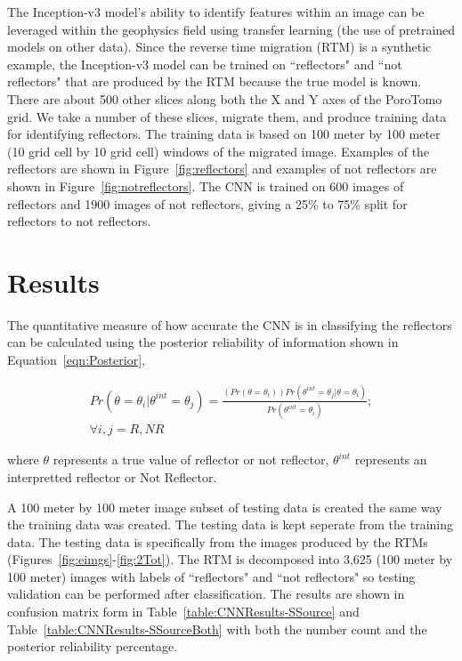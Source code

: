The Inception-v3 model's ability to identify features within an image can be leveraged within the geophysics field using transfer learning (the use of pretrained models on other data). Since the reverse time migration (RTM) is a synthetic example, the Inception-v3 model can be trained on ``reflectors" and ``not reflectors" that are produced by the RTM because the true model is known. There are about 500 other slices along both the X and Y axes of the PoroTomo grid. We take a number of these slices, migrate them, and produce training data for identifying reflectors. The training data is based on 100 meter by 100 meter (10 grid cell by 10 grid cell) windows of the migrated image. Examples of the reflectors are shown in Figure~\ref{fig:reflectors} and examples of not reflectors are shown in Figure~\ref{fig:notreflectors}. The CNN is trained on 600 images of reflectors and 1900 images of not reflectors, giving a 25\% to 75\% split for reflectors to not reflectors.


\section{Results}
The quantitative measure of how accurate the CNN is in classifying the reflectors can be calculated using the posterior reliability of information shown in Equation~\ref{eqn:Posterior},

\begin{equation}
  \begin{split}
  Pr(\theta=\theta_i | \theta^{int}=\theta_j)=  \frac{(Pr(\theta=\theta_i)) Pr(\theta^{int}=\theta_j | \theta=\theta_i)}{Pr(\theta^{int}=\theta_i)}; \\ \forall i,j={R, NR}
\end{split}
\label{eqn:Posterior}
\end{equation}

where $\theta$ represents a true value of reflector or not reflector, $\theta^{int}$ represents an interpretted reflector or Not Reflector.

A 100 meter by 100 meter image subset of testing data is created the same way the training data was created. The testing data is kept seperate from the training data. The testing data is specifically from the images produced by the RTMs (Figures~\ref{fig:eimgs}-\ref{fig:2Tot}). The RTM is decomposed into 3,625 (100 meter by 100 meter) images with labels of ``reflectors" and ``not reflectors" so testing validation can be performed after classification. The results are shown in confusion matrix form in Table~\ref{table:CNNResults-SSource} and Table~\ref{table:CNNResults-SSourceBoth} with both the number count and the posterior reliability percentage.

